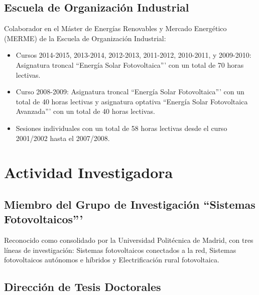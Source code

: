 \documentclass[article, a4paper]{memoir}
\begin{document}
\subsection{Escuela de Organización Industrial}
\label{sec-4-2}

Colaborador en el Máster de Energías Renovables y Mercado Energético (MERME) de la Escuela de Organización Industrial:

\begin{itemize}
\item Cursos 2014-2015, 2013-2014, 2012-2013, 2011-2012, 2010-2011, y 2009-2010: Asignatura troncal ``Energía Solar Fotovoltaica''' con un total de 70 horas lectivas.

\item Curso 2008-2009: Asignatura troncal ``Energía Solar Fotovoltaica''' con un total de 40 horas lectivas y asignatura optativa ``Energía Solar Fotovoltaica Avanzada''' con un total de 40 horas lectivas.

\item Sesiones individuales con un total de 58 horas lectivas desde el curso 2001/2002 hasta el 2007/2008.
\end{itemize}


\section{Actividad Investigadora}
\label{sec-5}

\subsection{Miembro del Grupo de Investigación ``Sistemas Fotovoltaicos'''}
\label{sec-5-1}

Reconocido como consolidado por la Universidad Politécnica de Madrid, con tres líneas de investigación: Sistemas fotovoltaicos conectados a la red, Sistemas fotovoltaicos autónomos e híbridos y Electrificación rural fotovoltaica.

\subsection{Dirección de Tesis Doctorales}
\label{sec-5-2}
\end{document}
